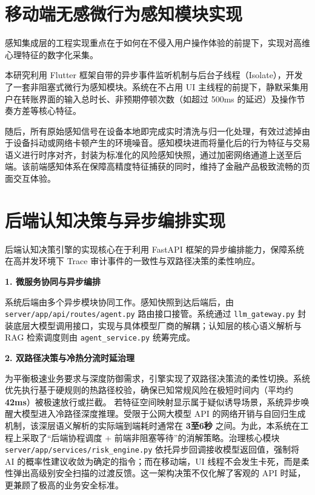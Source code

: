 \documentclass{xduugthesis}
\begin{document}
\section{移动端无感微行为感知模块实现}

感知集成层的工程实现重点在于如何在不侵入用户操作体验的前提下，实现对高维心理特征的数字化采集\cite{li2024cognitive}。

本研究利用 Flutter 框架自带的异步事件监听机制与后台子线程（Isolate），开发了一套非阻塞式微行为感知模块。系统在不占用 UI 主线程的前提下，静默采集用户在转账界面的输入总时长、非预期停顿次数（如超过 500ms 的延迟）及操作节奏方差等核心特征。

随后，所有原始感知信号在设备本地即完成实时清洗与归一化处理，有效过滤掉由于设备抖动或网络卡顿产生的环境噪音。感知模块进而将量化后的行为特征与交易语义进行时序对齐，封装为标准化的风险感知快照，通过加密网络通道上送至后端。该前端感知体系在保障高精度特征捕获的同时，维持了金融产品极致流畅的页面交互体验。

\section{后端认知决策与异步编排实现}

后端认知决策引擎的实现核心在于利用 FastAPI 框架的异步编排能力，保障系统在高并发环境下 Trace 审计事件的一致性与双路径决策的柔性响应。

\textbf{1. 微服务协同与异步编排}

系统后端由多个异步模块协同工作。感知快照到达后端后，由 \texttt{server/app/api/routes/agent.py} 路由接口接管。系统通过 \texttt{llm\_gateway.py} 封装底层大模型调用接口，实现与具体模型厂商的解耦；认知层的核心语义解析与 RAG 检索调度则由 \texttt{agent\_service.py} 统筹完成。

\textbf{2. 双路径决策与冷热分流时延治理}

为平衡极速业务要求与深度防御需求，引擎实现了双路径决策流的柔性切换。系统优先执行基于硬规则的热路径校验，确保已知常规风险在极短时间内（平均约 \textbf{42ms}）被极速放行或拦截。
若特征空间映射显示属于疑似诱导场景，系统异步唤醒大模型进入冷路径深度推理。受限于公网大模型 API 的网络开销与自回归生成机制，该深层语义解析的实际端到端耗时通常在 \textbf{3至6秒} 之间。为此，本系统在工程上采取了“后端协程调度 + 前端非阻塞等待”的消解策略。治理核心模块 \texttt{server/app/services/risk\_engine.py} 依托异步回调接收模型返回值，强制将 AI 的概率性建议收敛为确定的指令；而在移动端，UI 线程不会发生卡死，而是柔性弹出高级别安全扫描的过渡反馈。这一架构决策不仅化解了客观的 API 时延，更兼顾了极高的业务安全标准。
\end{document}

